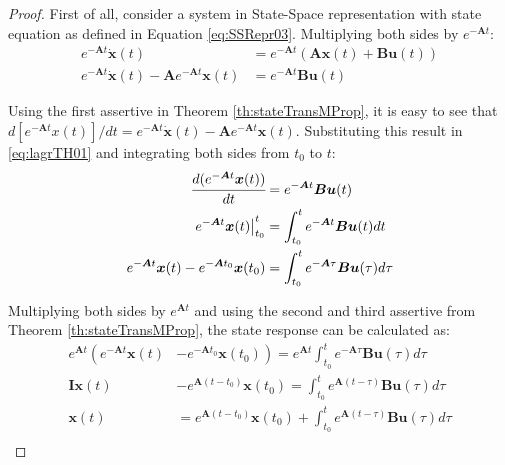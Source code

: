 \documentclass[a4paper,11pt]{book}
\numberwithin{figure}{chapter}
\numberwithin{equation}{chapter}
\numberwithin{table}{chapter}
\theoremstyle{definition}
\begin{document}
\begin{proof}
	First of all, consider a system in State-Space representation with state equation as defined in Equation \eqref{eq:SSRepr03}. Multiplying both sides by $e^{-\bm{A} t}$:
	\begin{equation} \label{eq:lagrTH01}
	\begin{split}
	    e^{-\bm{A} t} \dot{\bm{x}}(t) &= e^{-\bm{A} t} (\bm{A} \bm{x}(t) + \bm{B} \bm{u}(t)) \\
	    e^{-\bm{A} t} \dot{\bm{x}}(t) - \bm{A}e^{-\bm{A} t} \bm{x}(t)  &=  e^{-\bm{A} t} \bm{B} \bm{u}(t)
    \end{split}
	\end{equation}
	
	Using the first assertive in Theorem \ref{th:stateTransMProp}, it is easy to see that $d[e^{-\bm{A} t} x(t)]/dt = e^{-\bm{A} t} \dot{\bm{x}}(t) - \bm{A} e^{-\bm{A} t} \bm{x}(t)$. Substituting this result in \eqref{eq:lagrTH01} and integrating both sides from $t_0$ to $t$:
	\begin{equation} \label{eq:lagrTH02}
	\begin{split}
	    \cfrac{d(e^{-\bm{A} t} \bm{x}(t))}{dt} &= e^{-\bm{A} t} \bm{B} \bm{u}(t) \\
	    \left. e^{-\bm{A} t} \bm{x}(t) \right|^{t}_{t_0}  &= \int_{t_0}^{t} e^{-\bm{A} t} \bm{B} \bm{u}(t) dt \\
	    e^{-\bm{A} t} \bm{x}(t) - e^{-\bm{A} t_0} \bm{x}(t_0)  &= \int_{t_0}^{t} e^{-\bm{A} \tau} \bm{B} \bm{u}(\tau) d\tau
    \end{split}
	\end{equation}
	
	Multiplying both sides by $e^{\bm{A} t}$ and using the second and third assertive from Theorem \ref{th:stateTransMProp}, the state response can be calculated as:
	\begin{equation} \label{eq:lagrTH03}
	\begin{split}
	    e^{\bm{A} t} \left( e^{-\bm{A} t} \bm{x}(t) \right. &- \left. e^{-\bm{A} t_0} \bm{x}(t_0) \right) = e^{\bm{A} t} \int_{t_0}^{t} e^{-\bm{A} \tau} \bm{B} \bm{u}(\tau) d\tau \\
	    \bm{I} \bm{x}(t) &- e^{\bm{A} (t - t_0)} \bm{x}(t_0) = \int_{t_0}^{t} e^{\bm{A}(t - \tau)} \bm{B} \bm{u}(\tau) d\tau \\
	    \bm{x}(t) &= e^{\bm{A} (t - t_0)} \bm{x}(t_0) + \int_{t_0}^{t} e^{\bm{A}(t - \tau)} \bm{B} \bm{u}(\tau) d\tau \\
    \end{split}
	\end{equation}
	

\end{proof}
\end{document}

